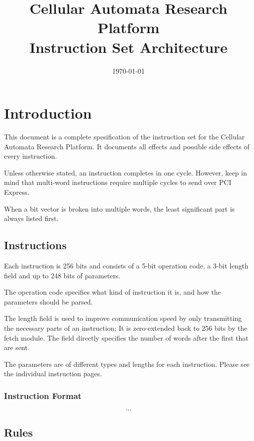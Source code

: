 \documentclass[a4paper]{article}
\title{Cellular Automata Research Platform\\Instruction Set Architecture}
\date{\today}
\begin{document}
\maketitle

\tableofcontents

\newpage

\setcounter{page}{1}

\section{Introduction}

This document is a complete spesification of the instruction set for the Cellular Automata Research Platform.
It documents all effects and possible side effects of every instruction.

Unless otherwise stated, an instruction completes in one cycle.
However, keep in mind that multi-word instructions require multiple cycles to send over PCI Express.

When a bit vector is broken into multiple words, the least significant part is always listed first.

\newpage
\subsection{Instructions}

Each instruction is 256 bits and consists of a 5-bit operation code, a 3-bit length field and up to 248 bits of parameters.

The operation code specifies what kind of instruction it is, and how the parameters should be parsed.

The length field is used to improve communication speed by only transmitting the necessary parts of an instruction;
It is zero-extended back to 256 bits by the fetch module.
The field directly specifies the number of words after the first that are sent.

The parameters are of different types and lengths for each instruction.
Please see the individual instruction pages.

\subsubsection*{Instruction Format}

$$...$$

\newpage
\subsection{Rules}
\end{document}
